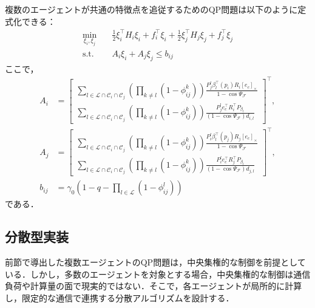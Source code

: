 複数のエージェントが共通の特徴点を追従するためのQP問題は以下のように定式化できる：
\begin{equation}
\begin{aligned}
\min_{\xi_i, \xi_j} \quad & \frac{1}{2}\xi_i^\top H_i \xi_i + f_i^\top \xi_i + \frac{1}{2}\xi_j^\top H_j \xi_j + f_j^\top \xi_j \\
\mathrm{s.t.} \quad & A_i \xi_i + A_j \xi_j \leq b_{ij}
\label{eq:common_cbf_qp}
\end{aligned}
\end{equation}
ここで，
\begin{equation}
\begin{aligned}
A_i &= \begin{bmatrix}
\sum_{l \in \mathcal{L} \cap \mathcal{C}_i \cap \mathcal{C}_j}\left(\prod_{k \neq l}(1 - \phi_{ij}^k)\right) \frac{P_j^l\beta_l^\top(p_i) R_i [e_c]_\times}{1 - \cos\Psi_{\mathcal{F}}} \\
\sum_{l \in \mathcal{L} \cap \mathcal{C}_i \cap \mathcal{C}_j}\left(\prod_{k \neq l}(1 - \phi_{ij}^k)\right)\frac{P_j^le_c^\top R_i^\top P_{\beta_l}}{(1 - \cos\Psi_{\mathcal{F}})d_{i,l}}
\end{bmatrix}^\top, \\
A_j &= \begin{bmatrix}
\sum_{l \in \mathcal{L} \cap \mathcal{C}_i \cap \mathcal{C}_j}\left(\prod_{k \neq l}(1 - \phi_{ij}^k)\right) \frac{P_i^l\beta_l^\top(p_j) R_j [e_c]_\times}{1 - \cos\Psi_{\mathcal{F}}} \\
\sum_{l \in \mathcal{L} \cap \mathcal{C}_i \cap \mathcal{C}_j}\left(\prod_{k \neq l}(1 - \phi_{ij}^k)\right)\frac{P_i^le_c^\top R_j^\top P_{\beta_l}}{(1 - \cos\Psi_{\mathcal{F}})d_{j,l}}
\end{bmatrix}^\top, \\
b_{ij} &= \gamma_0 \left(1 - q - \prod_{l \in \mathcal{L}}(1 - \phi_{ij}^l)\right)
\label{eq:common_cbf_qp_params}
\end{aligned}
\end{equation}
である．

\subsection{分散型実装}

前節で導出した複数エージェントのQP問題は，中央集権的な制御を前提としている．しかし，多数のエージェントを対象とする場合，中央集権的な制御は通信負荷や計算量の面で現実的ではない．そこで，各エージェントが局所的に計算し，限定的な通信で連携する分散アルゴリズムを設計する．


